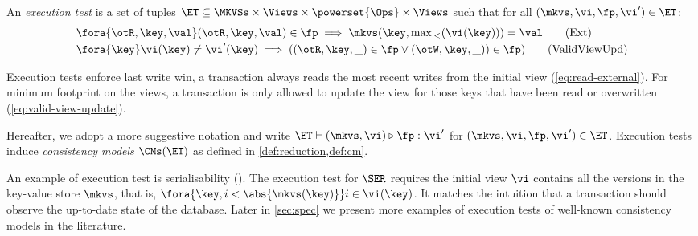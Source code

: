 \begin{definition}
\label{def:execution.test}
An \emph{execution test} is a set of tuples $\ET \subseteq \MKVSs \times \Views \times \powerset{\Ops} \times \Views$ 
such that for all $(\mkvs, \vi, \fp, \vi') \in \ET$:
\begin{align}
    & \fora{\otR, \key, \val} (\otR, \key, \val) \in \fp \implies \mkvs(\key, \max{}_{<}(\vi(\key))) = \val \tag{Ext} \label{eq:read-external} \\
    & \fora{\key} \vi(\key) \neq \vi'(\key) \implies
    ( (\otR, \key, \_) \in \fp \vee (\otW, \key, \_)) \in \fp) \tag{ValidViewUpd} \label{eq:valid-view-update}
\end{align}
\end{definition}

Execution tests enforce last write win,
\ie a transaction always reads the most recent writes from the initial view (\cref{eq:read-external}).
For minimum footprint on the views, a transaction is only allowed to update the view for those keys that have been read or overwritten (\cref{eq:valid-view-update}).


Hereafter, we adopt a more suggestive notation and write $\ET \vdash (\mkvs, \vi) \triangleright \fp: \vi'$ 
for $(\mkvs, \vi, \fp, \vi') \in \ET$.
Execution tests induce \emph{consistency models} \( \CMs(\ET) \) as defined in \cref{def:reduction,def:cm}.

An example of execution test is serialisability (\SER).
The execution test for \( \SER \) requires the initial view  \( \vi \) contains all the versions in the key-value store \( \mkvs \), that is, \( \fora{\key, i < \abs{\mkvs(\key)} } i \in \vi(\key)\).
It matches the intuition that a transaction should observe the up-to-date state of the database.
Later in \cref{sec:spec} we present more examples of execution tests of well-known consistency models in the literature. 


